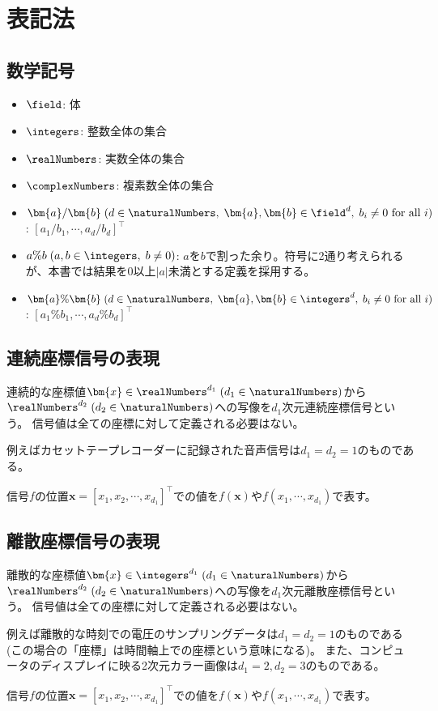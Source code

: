  \part{表記法}
		\chapter{数学記号}
			\begin{itemize}
				\item $\field$: 体
				\item $\integers$: 整数全体の集合
				\item $\realNumbers$: 実数全体の集合
				\item $\complexNumbers$: 複素数全体の集合
				\item $\bm{a}/\bm{b}\;(d \in \naturalNumbers,\;\bm{a},\bm{b} \in \field^d,\;b_i\neq 0 \text{ for all }i)$: $[a_1/b_1,\cdots,a_d/b_d]^\top$
				\item $a\%b\;(a,b\in\integers,\;b\neq 0)$: $a$を$b$で割った余り。符号に2通り考えられるが、本書では結果を0以上$|a|$未満とする定義を採用する。
				\item $\bm{a}\%\bm{b}\;(d\in\naturalNumbers,\;\bm{a},\bm{b} \in \integers^d,\; b_i\neq 0 \text{ for all }i)$: $[a_1\%b_1,\cdots,a_d\%b_d]^\top$
			\end{itemize}
		
		\chapter{連続座標信号の表現}
			連続的な座標値$\bm{x}\in\realNumbers^{d_1}\;(d_1\in\naturalNumbers)$から$\realNumbers^{d_2}\;(d_2\in\naturalNumbers)$への写像を$d_1$次元連続座標信号という。
			信号値は全ての座標に対して定義される必要はない。
			\par
			例えばカセットテープレコーダーに記録された音声信号は$d_1=d_2=1$のものである。
			\par
			信号$f$の位置$\bm{x} = [x_1,x_2,\cdots,x_{d_1}]^\top$での値を$f(\bm{x})$や$f(x_1,\cdots,x_{d_1})$で表す。

		\chapter{離散座標信号の表現}
			離散的な座標値$\bm{x}\in\integers^{d_1}\;(d_1\in\naturalNumbers)$から$\realNumbers^{d_2}\;(d_2\in\naturalNumbers)$への写像を$d_1$次元離散座標信号という。
			信号値は全ての座標に対して定義される必要はない。
			\par
			例えば離散的な時刻での電圧のサンプリングデータは$d_1=d_2=1$のものである(この場合の「座標」は時間軸上での座標という意味になる)。
			また、コンピュータのディスプレイに映る2次元カラー画像は$d_1=2,d_2=3$のものである。
			\par
			信号$f$の位置$\bm{x} = [x_1,x_2,\cdots,x_{d_1}]^\top$での値を$f(\bm{x})$や$f(x_1,\cdots,x_{d_1})$で表す。
